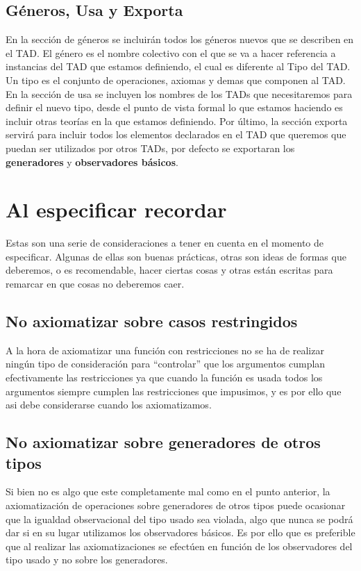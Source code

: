\documentclass[10pt, a4paper]{report}
\begin{document}
\subsection{G\'eneros, Usa y Exporta}

En la secci\'on de g\'eneros se incluir\'an todos los g\'eneros nuevos que se describen en el TAD. El g\'enero es el nombre colectivo con el que se va a hacer referencia a instancias del TAD que estamos definiendo, el cual es diferente al Tipo del TAD. Un tipo es el conjunto de operaciones, axiomas y demas que componen al TAD. En la secci\'on de usa se incluyen los nombres de los TADs que necesitaremos para definir el nuevo tipo, desde el punto de vista formal lo que estamos haciendo es incluir otras teor\'ias en la que estamos definiendo. Por \'ultimo, la secci\'on exporta servir\'a para incluir todos los elementos declarados en el TAD que queremos que puedan ser utilizados por otros TADs, por defecto se exportaran los \textbf{generadores} y \textbf{observadores b\'asicos}.

\section{Al especificar recordar}

Estas son una serie de consideraciones a tener en cuenta en el momento de especificar. Algunas de ellas son buenas pr\'acticas, otras son ideas de formas que deberemos, o es recomendable, hacer ciertas cosas y otras est\'an escritas para remarcar en que cosas no deberemos caer.

\subsection{No axiomatizar sobre casos restringidos}

A la hora de axiomatizar una funci\'on con restricciones no se ha de realizar ning\'un tipo de consideraci\'on para ``controlar''  que los argumentos cumplan efectivamente las restricciones ya que cuando la funci\'on es usada todos los argumentos siempre cumplen las restricciones que impusimos, y es por ello que asi debe considerarse cuando los axiomatizamos.

\subsection{No axiomatizar sobre generadores de otros tipos}

Si bien no es algo que este completamente mal como en el punto anterior, la axiomatizaci\'on de operaciones sobre generadores de otros tipos puede ocasionar que la igualdad observacional del tipo usado sea violada, algo que nunca se podr\'a dar si en su lugar utilizamos los observadores b\'asicos. Es por ello que es preferible que al realizar las axiomatizaciones se efect\'uen en funci\'on de los observadores del tipo usado y no sobre los generadores.
\end{document}
